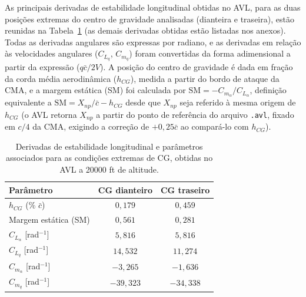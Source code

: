 
As principais derivadas de estabilidade longitudinal obtidas no AVL, para as duas posições extremas do centro de gravidade analisadas (dianteira e traseira), estão reunidas na Tabela~\ref{tab:derivadas_long} (as demais derivadas obtidas estão listadas nos anexos). Todas as derivadas angulares são expressas por radiano, e as derivadas em relação às velocidades angulares ($C_{L_q}$, $C_{m_q}$) foram convertidas da forma adimensional a partir da expressão ($q\bar{c}/2V$). A posição do centro de gravidade é dada em fração da corda média aerodinâmica ($h_{CG}$), medida a partir do bordo de ataque da CMA, e a margem estática (SM) foi calculada por $\text{SM} = -C_{m_\alpha}/C_{L_\alpha}$, definição equivalente a $\text{SM} = X_{np}/\bar{c} - h_{CG}$ desde que $X_{np}$ seja referido à mesma origem de $h_{CG}$ (o AVL retorna $X_{np}$ a partir do ponto de referência do arquivo \texttt{.avl}, fixado em $c/4$ da CMA, exigindo a correção de $+0{,}25\bar{c}$ ao compará-lo com $h_{CG}$).

\begin{table}[H]
    \centering
    \caption{Derivadas de estabilidade longitudinal e parâmetros associados para as condições extremas de CG, obtidas no AVL a 20000 ft de altitude.}
    \begin{tabular}{|l|c|c|}
       \hline
       \textbf{Parâmetro} & \textbf{CG dianteiro} & \textbf{CG traseiro} \\
       \hline
       $h_{CG}$ (\%  $\bar{c}$)        & $0{,}179$   & $0{,}459$  \\
       \hline
       Margem estática (SM)              & $0{,}561$   & $0{,}281$  \\
       \hline
       $C_{L_\alpha}$ [rad$^{-1}$]       & $5{,}816$   & $5{,}816$  \\
       \hline
       $C_{L_q}$ [rad$^{-1}$]            & $14{,}532$  & $11{,}274$ \\
       \hline
       $C_{m_\alpha}$ [rad$^{-1}$]       & $-3{,}265$  & $-1{,}636$ \\
       \hline
       $C_{m_q}$ [rad$^{-1}$]            & $-39{,}323$ & $-34{,}338$\\
       \hline
    \end{tabular}
    \label{tab:derivadas_long}
\end{table}

